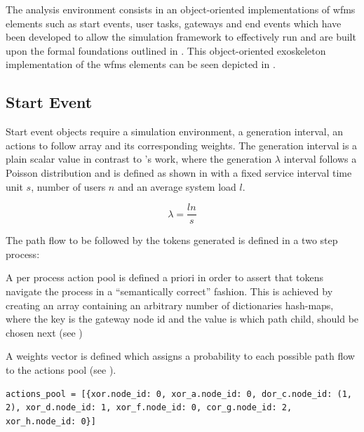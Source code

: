 The analysis environment consists in an object-oriented implementations of \gls{wfms} elements such as start events, user tasks, gateways and end events which have been developed to allow the simulation framework to effectively run and are built upon the formal foundations outlined in . This object-oriented exoskeleton implementation of the \gls{wfms} elements can be seen depicted in .


\subsection{Start Event}

Start event objects require a simulation environment, a generation interval, an actions to follow array and its corresponding weights. The generation interval is a plain scalar value in contrast to \citet{Zeng2005}'s work, where the generation $\lambda$ interval follows a Poisson distribution and is defined as shown in  with a fixed service interval time unit $s$, number of users $n$ and an average system load $l$.

\begin{equation}
\label{eq:generation_interval}
	\lambda = \frac{l n}{s}
\end{equation}

The path flow to be followed by the tokens generated is defined in a two step process:
\begin{enumerate*}
	\item A per process action pool is defined a priori in order to assert that tokens navigate the process in a ``semantically correct'' fashion. This is achieved by creating an array containing an arbitrary number of dictionaries \ie hash-maps, where the key is the gateway node id and the value is which path \ie child, should be chosen next (see )
	\item A weights vector is defined which assigns a probability to each possible path flow to the actions pool (see ).
\end{enumerate*}

\begin{lstlisting}[caption=Actions pool,label=lst:actions_pool,style=CustomPython]
    actions_pool = [{xor.node_id: 0, xor_a.node_id: 0, dor_c.node_id: (1, 2), xor_d.node_id: 1, xor_f.node_id: 0, cor_g.node_id: 2, xor_h.node_id: 0}]
\end{lstlisting}

